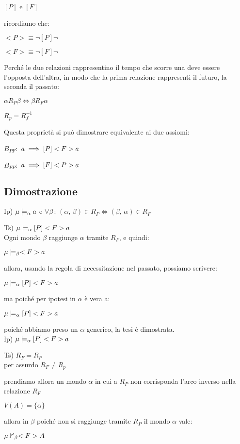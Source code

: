 $[P]$ e $[F]$

ricordiamo che:

$<P>\equiv\neg[P]\neg$

$<F>\equiv\neg[F]\neg$

Perché le due relazioni rappresentino il tempo che scorre una deve
essere l'opposta dell'altra, in modo che la prima relazione rappresenti
il futuro, la seconda il passato:

$\alpha R_{P}\beta\iff\beta R_{F}\alpha$

$R_{p}=R_{f}^{-1}$

Questa proprietà si può dimostrare equivalente ai due assiomi:

$B_{PF}:$ $a\implies[P]<F>a$

$B_{FP}:$ $a\implies[F]<P>a$


\subsection{Dimostrazione}

Ip) $\mu\models_{\alpha}a$ e $\forall\beta\,:\,(\alpha,\,\beta)\in R_{P}\iff(\beta,\,\alpha)\in R_{F}$

Ts) $\mu\models_{\alpha}[P]<F>a$\\


Ogni mondo $\beta$ raggiunge $\alpha$ tramite $R_{F}$, e quindi:

$\mu\models_{\beta}<F>a$

allora, usando la regola di necessitazione nel passato, possiamo scrivere:

$\mu\models_{\alpha}[P]<F>a$

ma poiché per ipotesi in $\alpha$ è vera a:

$\mu\models_{\alpha}[P]<F>a$

poiché abbiamo preso un $\alpha$ generico, la tesi è dimostrata.\\
Ip) $\mu\models_{\alpha}[P]<F>a$

Ts) $R_{F}=R_{P}$\\


per assurdo $R_{F}\neq R_{p}$

prendiamo allora un mondo $\alpha$ in cui a $R_{P}$ non corrisponda
l'arco inverso nella relazione $R_{F}$

$V(A)=\{\alpha\}$

allora in $\beta$ poiché non si raggiunge tramite $R_{P}$ il mondo
$\alpha$ vale:

$\mu\nvDash_{\beta}<F>A$

